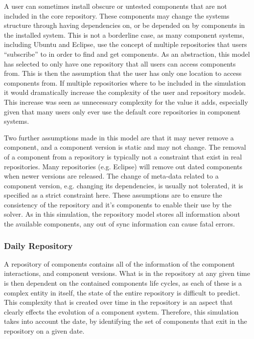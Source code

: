 A user can sometimes install obscure or untested components that are not included in the core repository.
These components may change the systems structure through having dependencies on, or be depended on by components in the installed system.
This is not a borderline case, as many component systems, including Ubuntu and Eclipse, use the concept of multiple repositories that users ``subscribe'' to in order to find and get components.
As an abstraction, this model has selected to only have one repository that all users can access components from.
This is then the assumption that the user has only one location to access components from.
If multiple repositories where to be included in the simulation it would dramatically increase the complexity of the user and repository models.
This increase was seen as unnecessary complexity for the value it adds, especially given that many users only ever use the default core repositories in component systems.

Two further assumptions made in this model are that it may never remove a component, and a component version is static and may not change.
The removal of a component from a repository is typically not a constraint that exist in real repositories.
Many repositories (e.g. Eclipse) will remove out dated components when newer versions are released.
The change of meta-data related to a component version, e.g. changing its dependencies, is usually not tolerated, it is specified as a strict constraint here.
These assumptions are to ensure the consistency of the repository and it's components to enable their use by the solver. 
As in this simulation, the repository model stores all information about the available components, any out of sync information can cause fatal errors.

\subsubsection{Daily Repository}
A repository of components contains all of the information of the component interactions, and component versions.
What is in the repository at any given time is then dependent on the contained components life cycles,
as each of these is a complex entity in itself, the state of the entire repository is difficult to predict.
This complexity that is created over time in the repository is an aspect that clearly effects the evolution of a component system.
Therefore, this simulation takes into account the date, by identifying the set of components that exit in the repository on a given date.

